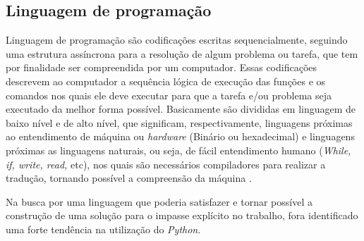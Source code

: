 \subsection{{Linguagem de programação}}

Linguagem de programação são codificações escritas sequencialmente, seguindo uma estrutura assíncrona para a resolução de algum problema ou tarefa, que tem por finalidade ser compreendida por um computador. Essas codificações descrevem ao computador a sequência lógica de execução das funções e os comandos nos quais ele deve executar para que a tarefa e/ou problema seja executado da melhor forma possível. Basicamente são divididas em linguagem de baixo nível e de alto nível, que significam, respectivamente, linguagens próximas ao entendimento de máquina ou \textit{hardware} (Binário ou hexadecimal) e linguagens próximas as linguagens naturais, ou seja, de fácil entendimento humano (\textit{While, if, write, read,} etc), nos quais são necessários compiladores para realizar a tradução, tornando possível a compreensão da máquina \cite{KELLEHER2005}.

Na busca por uma linguagem que poderia satisfazer e tornar possível a construção de uma solução para o impasse explícito no trabalho, fora identificado uma forte tendência na utilização do \textit{Python}.

\begin{comment}
De acordo com \citeonline{PILGRIM2009}, a projeção da linguagem enfatiza o trabalho do programador sobre o computacional, possibilitando assim a construção de bibliotecas e frameworks com uma facilidade acima do normal.

\textit{Python} foi criado por Guido van Rossum em 1991, com a ajuda de seus colegas Jack Jansen e Sjoerd Mullender. O objetivo deles era criar uma linguagem de fácil entendimento, orientada a objetos, menos complexa possível \cite{SONGINI2005}.

Segundo \citeonline{OLIVEIRA2007}, a linguagem sofreu vários ajustes no decorrer dos anos, tornando-se muito popular dentre os desenvolvedores e, consequentemente, dando início a enumeras aplicações. Portanto, \textit{Python} é uma linguagem orientada a objetos, fortemente tipada, com propositos gerais de alto nível e de código aberto, objetivando uma construção ágil no desenvolvimento de aplicações. Sua sintaxe e bem simples e de fácil entendimento, reduzindo o custo de manutenção em \textit{softwares} criados a partir desta. Suas bibliotecas garantem ao programador um vasto acervo de funções que tem por finalidade facilitar o seu trabalho, reduzir tempo de codificação e evitar arquivos com extensas linhas de código. Devido à comunidade de código aberto, onde desenvolvedores tem acesso ao seu código fonte, a popularização da linguagem vem crescendo de forma significativa, visto que esta ainda não é muito conhecida \cite{SONGINI2005}.
\end{comment}